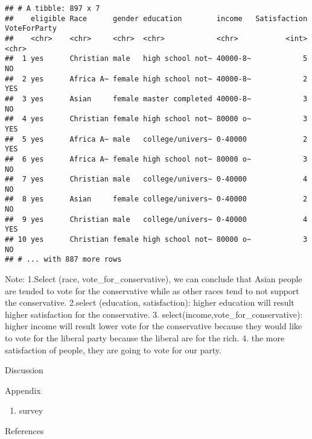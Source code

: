 \documentclass[
]{article}
\providecommand{\tightlist}{%
  \setlength{\itemsep}{0pt}\setlength{\parskip}{0pt}}
\begin{document}
\begin{verbatim}
## # A tibble: 897 x 7
##    eligible Race      gender education        income   Satisfaction VoteForParty
##    <chr>    <chr>     <chr>  <chr>            <chr>           <int> <chr>       
##  1 yes      Christian male   high school not~ 40000-8~            5 NO          
##  2 yes      Africa A~ female high school not~ 40000-8~            2 YES         
##  3 yes      Asian     female master completed 40000-8~            3 NO          
##  4 yes      Christian female high school not~ 80000 o~            3 YES         
##  5 yes      Africa A~ male   college/univers~ 0-40000             2 YES         
##  6 yes      Africa A~ female high school not~ 80000 o~            3 NO          
##  7 yes      Christian male   college/univers~ 0-40000             4 NO          
##  8 yes      Asian     female college/univers~ 0-40000             2 NO          
##  9 yes      Christian male   college/univers~ 0-40000             4 YES         
## 10 yes      Christian female high school not~ 80000 o~            3 NO          
## # ... with 887 more rows
\end{verbatim}

Note: 1.Select (race, vote\_for\_conservative), we can conclude that
Asian people are tended to vote for the conservative while as other
races tend to not support the conservative. 2.select (education,
satisfaction): higher education will result higher satisfaction for the
conservative. 3. select(income,vote\_for\_conservative): higher income
will result lower vote for the conservative because they would like to
vote for the liberal party because the liberal are for the rich. 4. the
more satisfaction of people, they are going to vote for our party.

Discussion

Appendix

\begin{enumerate}
\def\labelenumi{\arabic{enumi}.}
\tightlist
\item
  survey
\end{enumerate}

References
\end{document}

